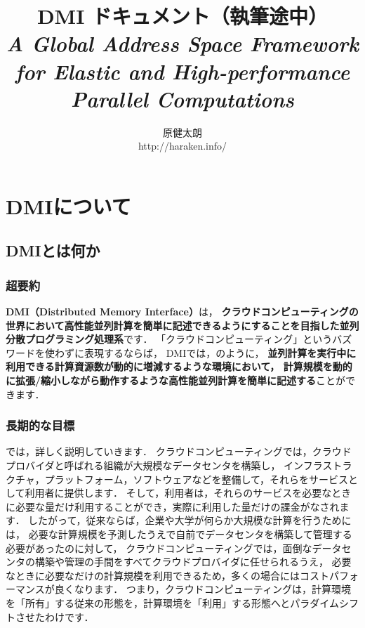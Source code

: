 \documentclass[report,12pt]{jsbook}
\title{DMI ドキュメント（執筆途中）\\\vspace*{20pt}
  {\Large \textit{A Global Address Space Framework}\\
    \textit{for Elastic and High-performance Parallel Computations}}}
\author{原健太朗\\\vspace*{20pt}
  http://haraken.info/}
\date{\mytoday}
\begin{document}
\maketitle

\tableofcontents

\chapter{DMIについて}

\section{DMIとは何か}

\subsection{超要約}

\textbf{DMI（Distributed Memory Interface）}は，
\textbf{クラウドコンピューティングの世界において高性能並列計算を簡単に記述できるようにすることを目指した並列分散プログラミング処理系}です．
「クラウドコンピューティング」というバズワードを使わずに表現するならば，
DMIでは，のように，
\textbf{並列計算を実行中に利用できる計算資源数が動的に増減するような環境において，
計算規模を動的に拡張/縮小しながら動作するような高性能並列計算を簡単に記述する}ことができます．

\subsection{長期的な目標}

では，詳しく説明していきます．
クラウドコンピューティングでは，クラウドプロバイダと呼ばれる組織が大規模なデータセンタを構築し，
インフラストラクチャ，プラットフォーム，ソフトウェアなどを整備して，それらをサービスとして利用者に提供します．
そして，利用者は，それらのサービスを必要なときに必要な量だけ利用することができ，実際に利用した量だけの課金がなされます．
したがって，従来ならば，企業や大学が何らか大規模な計算を行うためには，
必要な計算規模を予測したうえで自前でデータセンタを構築して管理する必要があったのに対して，
クラウドコンピューティングでは，面倒なデータセンタの構築や管理の手間をすべてクラウドプロバイダに任せられるうえ，
必要なときに必要なだけの計算規模を利用できるため，多くの場合にはコストパフォーマンスが良くなります．
つまり，クラウドコンピューティングは，計算環境を「所有」する従来の形態を，計算環境を「利用」する形態へとパラダイムシフトさせたわけです．
\end{document}
